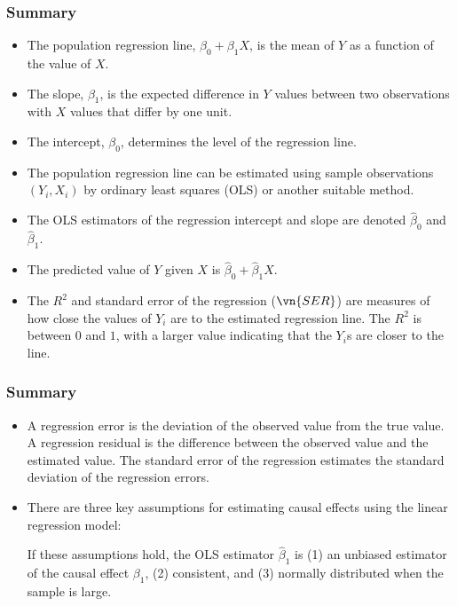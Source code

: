

\begin{frame}
\frametitle{Summary}
\begin{itemize}
\item The population regression line, $\beta_0 + \beta_1 X$, is the mean of $Y$ as a function of the value of $X$. 
\item The slope, $\beta_1$, is the expected difference in $Y$ values between two observations with $X$ values that differ by one unit. 
\item The intercept, $\beta_0$, determines the level of the regression line.
\item The population regression line can be estimated using sample observations $(Y_i, X_i)$ by ordinary least squares (OLS) or another suitable method. 
\item The OLS estimators of the regression intercept and slope are denoted $\hat{\beta}_0$ and $\hat{\beta}_1$. 
\item The predicted value of $Y$ given $X$ is $\hat{\beta}_0+\hat{\beta}_1X$.
\item The $R^2$ and standard error of the regression ($\vn{SER}$) are measures of how
close the values of $Y_i$ are to the estimated regression line. The $R^2$ is between $0$ and $1$, with a larger value indicating that the $Y_i$s are closer to the line. 
\end{itemize}
\end{frame}


\begin{frame}
\frametitle{Summary}
\begin{itemize}
\item A regression error is the deviation of the observed value from the true value. A regression residual is the difference between the observed value and the estimated value. The standard error of the regression estimates the standard deviation of the regression errors.
\item There are three key assumptions for estimating causal effects using the linear regression model: 
If these assumptions hold, the OLS estimator $\hat{\beta}_1$ is (1) an unbiased estimator of the causal effect $\beta_1$, (2) consistent, and (3) normally distributed when the sample is large.
\end{itemize}
\end{frame}

